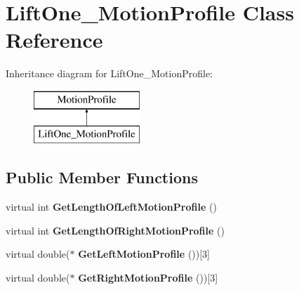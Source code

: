 \hypertarget{class_lift_one___motion_profile}{}\section{Lift\+One\+\_\+\+Motion\+Profile Class Reference}
\label{class_lift_one___motion_profile}
Inheritance diagram for Lift\+One\+\_\+\+Motion\+Profile\+:\begin{figure}[H]
\begin{center}
\leavevmode
\includegraphics[height=2.000000cm]{class_lift_one___motion_profile}
\end{center}
\end{figure}
\subsection*{Public Member Functions}
\begin{DoxyCompactItemize}
\item 
\mbox{\label{class_lift_one___motion_profile_a9600270fa65c2c590470f7852f00aa0d}} 
virtual int {\bfseries Get\+Length\+Of\+Left\+Motion\+Profile} ()
\item 
\mbox{\label{class_lift_one___motion_profile_a735ae0ce072abd8f057e53292239e244}} 
virtual int {\bfseries Get\+Length\+Of\+Right\+Motion\+Profile} ()
\item 
\mbox{\label{class_lift_one___motion_profile_a9675e08887c8d9f2937f825405da8fc9}} 
virtual double($\ast$ {\bfseries Get\+Left\+Motion\+Profile} ())\mbox{[}3\mbox{]}
\item 
\mbox{\label{class_lift_one___motion_profile_a36719853fd6e5c43a007c2eb25752f60}} 
virtual double($\ast$ {\bfseries Get\+Right\+Motion\+Profile} ())\mbox{[}3\mbox{]}
\end{DoxyCompactItemize}
